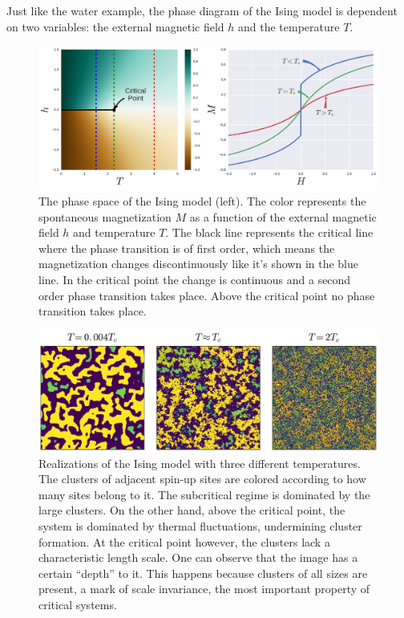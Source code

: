 Just like the water example, the phase diagram of the Ising model is dependent
on two variables: the external magnetic field $h$ and the temperature $T$.

\begin{figure}
\begin{center}
    \includegraphics[scale=0.4]{chapters/ch2-crit/figs/ising_phase2}
\end{center}
\caption{The phase space of the Ising model (left). The color represents the
    spontaneous magnetization $M$ as a function of the external magnetic field
    $h$ and temperature $T$. The black line represents the critical line where
    the phase transition is of first order, which means the magnetization
    changes discontinuously like it's shown in the blue line. In the critical
    point the change is continuous and a second order phase transition takes
    place. Above the critical point no phase transition takes place.}
\label{fig:ising_phase2}
\end{figure}


\begin{figure}
\begin{center}
    \includegraphics[scale=0.4]{chapters/ch2-crit/figs/ising}
\end{center}
\caption{Realizations of the Ising model with three different
    temperatures. The clusters of adjacent spin-up sites are colored according
    to how many sites belong to it. The subcritical regime is dominated by the
    large clusters. On the other hand, above the critical point, the system is
    dominated by thermal fluctuations, undermining cluster formation. At the
    critical point however, the clusters lack a characteristic length scale.
    One can observe that the image has a certain ``depth'' to it. This happens
    because clusters of all sizes are present, a mark of scale invariance,
    the most important property of critical systems.}
\label{fig:ising}
\end{figure}

